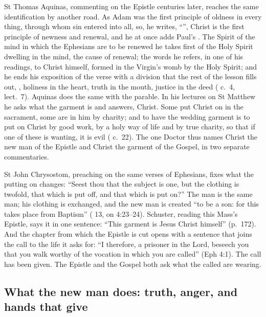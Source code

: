 St Thomas Aquinas, commenting on the Epistle centuries later, reaches the
same identification by another road. As Adam was the first principle of
oldness in every thing, through whom sin entered into all, so, he writes,
``'', Christ is
the first principle of newness and renewal, and he at once adds Paul's
. The Spirit of the mind in
which the Ephesians are to be renewed he takes first of the Holy Spirit
dwelling in the mind, the cause of renewal; the words 
he refers, in one of his readings, to Christ himself, formed in the Virgin's
womb by the Holy Spirit; and he ends his exposition of the verse with a
division that the rest of the lesson fills out, , holiness in the heart, truth in the
mouth, justice in the deed ( c.~4, lect.~7).
Aquinas does the same with the parable. In his lectures on St Matthew he asks
what the garment is and answers, Christ. Some put Christ on in the sacrament,
some are in him by charity; and to have the wedding garment is to put on
Christ by good work, by a holy way of life and by true charity, so that if one
of these is wanting, it is evil ( c.~22). The one Doctor thus
names Christ the new man of the Epistle and Christ the garment of the Gospel,
in two separate commentaries.

St John Chrysostom, preaching on the same verses of Ephesians, fixes what the
putting on changes: ``Seest thou that the subject is one, but the clothing is
twofold, that which is put off, and that which is put on?'' The man is the
same man; his clothing is exchanged, and the new man is created ``to be a son:
for this takes place from Baptism'' ( 13, on
4:23--24). Schuster, reading this Mass's Epistle, says it in one sentence:
``This garment is Jesus Christ himself'' (p.~172). And the chapter from which
the Epistle is cut opens with a sentence that joins the call to the life it
asks for: ``I therefore, a prisoner in the Lord, beseech you that you walk
worthy of the vocation in which you are called'' (Eph 4:1). The call has been
given. The Epistle and the Gospel both ask what the called are wearing.

\subsection{What the new man does: truth, anger, and hands that give}

